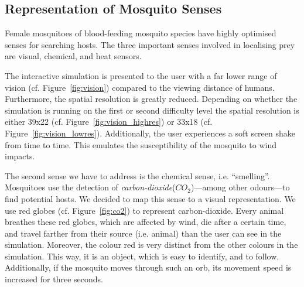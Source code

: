 \documentclass{sig-alternate-05-2015}
\begin{document}
\subsection{Representation of Mosquito Senses}
\label{sec:senses}
Female mosquitoes of blood-feeding mosquito species have highly optimised senses for searching hosts. The three important senses involved in localising prey are visual, chemical, and heat sensors. 

The interactive simulation is presented to the user with a far lower range of vision (cf. Figure~\ref{fig:vision}) compared to the viewing distance of humans. Furthermore, the spatial resolution is greatly reduced. Depending on whether the simulation is running on the first or second difficulty level the spatial resolution is either 39x22 (cf. Figure~\ref{fig:vision_highres}) or 33x18 (cf. Figure~\ref{fig:vision_lowres}). Additionally, the user experiences a soft screen shake from time to time. This emulates the susceptibility of the mosquito to wind impacts.


The second sense we have to address is the chemical sense, i.e. ``smelling''. Mosquitoes use the detection of \textit{carbon-dioxide}($CO_2$)---among other odours---to find potential hosts. We decided to map this sense to a visual representation. We use red globes (cf. Figure~\ref{fig:co2}) to represent carbon-dioxide. Every animal breathes these red globes, which are affected by wind, die after a certain time, and travel farther from their source (i.e. animal) than the user can see in the simulation. Moreover, the colour red is very distinct from the other colours in the simulation. This way, it is an object, which is easy to identify, and to follow. Additionally, if the mosquito moves through such an orb, its movement speed is increased for three seconds.
\end{document}
